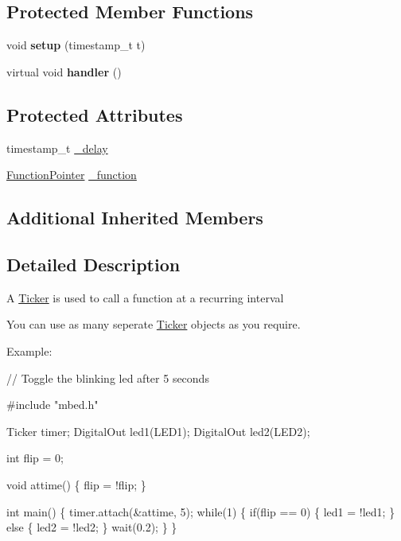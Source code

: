 \subsection*{Protected Member Functions}
\begin{DoxyCompactItemize}
\item 
void {\bfseries setup} (timestamp\+\_\+t t)\hypertarget{classmbed_1_1Ticker_aec593bf08c90b657a84f128eef3c3914}{}\label{classmbed_1_1Ticker_aec593bf08c90b657a84f128eef3c3914}

\item 
virtual void {\bfseries handler} ()\hypertarget{classmbed_1_1Ticker_a9e700f503716083f8549eec801f13710}{}\label{classmbed_1_1Ticker_a9e700f503716083f8549eec801f13710}

\end{DoxyCompactItemize}
\subsection*{Protected Attributes}
\begin{DoxyCompactItemize}
\item 
timestamp\+\_\+t \hyperlink{classmbed_1_1Ticker_aeadd82ef601473e6dfb7a16d86568731}{\+\_\+delay}
\item 
\hyperlink{classmbed_1_1FunctionPointerArg1}{Function\+Pointer} \hyperlink{classmbed_1_1Ticker_a1258396e7210d369b75fc227ea1dce4d}{\+\_\+function}
\end{DoxyCompactItemize}
\subsection*{Additional Inherited Members}


\subsection{Detailed Description}
A \hyperlink{classmbed_1_1Ticker}{Ticker} is used to call a function at a recurring interval

You can use as many seperate \hyperlink{classmbed_1_1Ticker}{Ticker} objects as you require.

Example\+: 
\begin{DoxyCode}
\textcolor{comment}{// Toggle the blinking led after 5 seconds}

\textcolor{preprocessor}{#include "mbed.h"}

Ticker timer;
DigitalOut led1(LED1);
DigitalOut led2(LED2);

\textcolor{keywordtype}{int} flip = 0;

\textcolor{keywordtype}{void} attime() \{
    flip = !flip;
\}

\textcolor{keywordtype}{int} main() \{
    timer.attach(&attime, 5);
    \textcolor{keywordflow}{while}(1) \{
        \textcolor{keywordflow}{if}(flip == 0) \{
            led1 = !led1;
        \} \textcolor{keywordflow}{else} \{
            led2 = !led2;
        \}
        wait(0.2);
    \}
\}
\end{DoxyCode}
 

